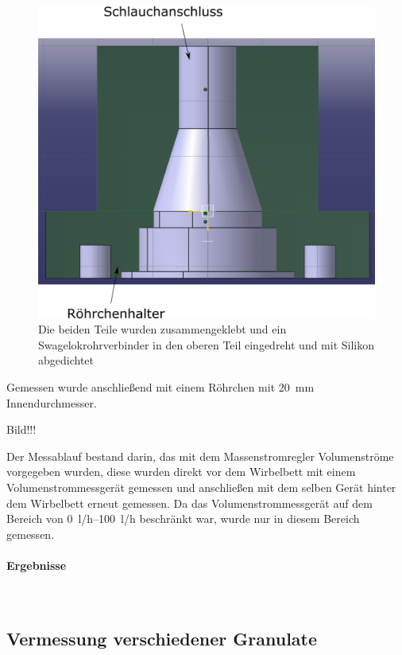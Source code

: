 \begin{figure}[h]
	\begin{center}
		\includegraphics[scale=0.5]{Abnehmer_Volumenstrom.png}
		\caption[Volumenstrommessung]{Die beiden Teile wurden zusammengeklebt und ein Swagelokrohrverbinder in den oberen Teil eingedreht und mit Silikon abgedichtet}
	\end{center}
\end{figure}

Gemessen wurde anschließend mit einem Röhrchen mit \SI{20}{mm} Innendurchmesser.

Bild!!!


Der Messablauf bestand darin, das mit dem Massenstromregler Volumenströme vorgegeben wurden, diese wurden direkt vor dem Wirbelbett mit einem Volumenstrommessgerät gemessen und anschließen mit dem selben Gerät hinter dem Wirbelbett erneut gemessen. Da das Volumenstrommessgerät auf dem Bereich von \SIrange{0}{100}{l/h} beschränkt war, wurde nur in diesem Bereich gemessen.


\paragraph{Ergebnisse}
\hfill \\


\subsection{Vermessung verschiedener Granulate}




